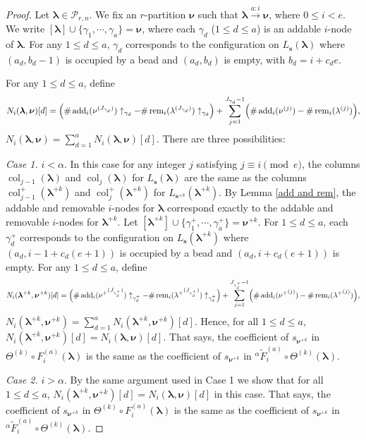 \documentclass[a4paper,10pt]{amsart}
\theoremstyle{plain}
\def\bs{{\boldsymbol{s}}}
\def\blam{{\boldsymbol \lambda}}
\def\bnu{{\boldsymbol \nu}}
\DeclareMathOperator{\col}{col}
\newcommand{\add}{\operatorname{add}}
\newcommand{\rem}{\operatorname{rem}}
\theoremstyle{plain}
\numberwithin{equation}{section}
\begin{document}
\begin{proof}
Let $\blam \in \mathscr P_{r, n}$. We fix an $r$-partition $\bnu$ such that $\blam\xrightarrow{a:i} \bnu$, where $0\le i<e$. We write $[\blam] \cup \{\gamma_1, \cdots, \gamma_a\}=\bnu$, where each $\gamma_d$ ($1\le d\le a$) is an addable $i$-node of $\blam$. For any $1\le d\le a$, $\gamma_d$ corresponds to the configuration on $L_\bs(\blam)$ where $(a_d, b_d-1)$ is occupied by a bead and $(a_d, b_d)$ is empty, with $b_d=i+c_de$.

For any $1\le d\le a$, define
$$N_i(\blam, \bnu)[d]=\Bigl(\#\add_i (\nu^{(J_{\gamma_d})} )\uparrow_{\gamma_d}-\#\rem_i (\lambda^{(J_{\gamma_d})})\uparrow_{\gamma_d}\Bigr)+ \sum^{J_{\gamma_d}-1}_{j=1}\Bigl(\#\add_i (\nu^{(j)})-\#\rem_i (\lambda^{(j)})\Bigr),$$
$N_i(\blam, \bnu)=\sum_{d=1}^a N_i(\blam, \bnu)[d].$ There are three possibilities:

{\it Case 1.} $i<\alpha$. In this case for any integer $j$ satisfying $j\equiv i\pmod e$, the columns $\col_{j-1}(\blam)$ and $\col_j(\blam)$ for $L_\bs(\blam)$ are the same as the columns $\col^+_{j-1}(\blam^{+k})$ and $\col^+_j(\blam^{+k})$ for $L_{\bs^{+k}}(\blam^{+k})$. By Lemma \ref{add and rem}, the addable and removable $i$-nodes for $\blam$ correspond exactly to the addable and removable $i$-nodes for $\blam^{+k}$.
Let $[\blam^{+k}]\cup \{\gamma^+_1, \cdots, \gamma^+_a\}=\bnu^{+k}$. For $1\le d\le a$, each $\gamma_d^+$ corresponds to the configuration on $L_\bs(\blam^{+k})$ where $(a_d, i-1+c_d(e+1))$ is occupied by a bead and $(a_d, i+c_d(e+1))$ is empty.
For any $1\le d\le a$, define
$$N_i(\blam^{+k}, \bnu^{+k})[d]=\Bigl(\#\add_i ({\nu^+}^{(J_{\gamma^+_d})} )\uparrow_{\gamma^+_d}-\#\rem_i ({\lambda^+}^{(J_{\gamma^+_d})})\uparrow_{\gamma^+_d}\Bigr)+ \sum^{J_{\gamma^+_d}-1}_{j=1}\Bigl(\#\add_i ({\nu^+}^{(j)})-\#\rem_i ({\lambda^+}^{(j)})\Bigr),$$
$N_i(\blam^{+k}, \bnu^{+k})=\sum_{d=1}^a N_i(\blam^{+k}, \bnu^{+k})[d].$
Hence, for all $1\le d\le a$, $N_i(\blam^{+k}, \bnu^{+k})[d]=N_i(\blam, \bnu)[d]$. That says, the coefficient of $s_{\bnu^{+k}}$ in $\varTheta^{(k)}\circ F_i^{(a)}(\blam)$ is the same as the coefficient of $s_{\bnu^{+k}}$ in ${^\alpha}\!\tilde{F}_i^{(a)}\circ \varTheta^{(k)}(\blam)$.
\smallskip

{\it Case 2.} $i>\alpha$. By the same argument used in Case 1 we show that  for all $1\le d\le a$, $N_i(\blam^{+k}, \bnu^{+k})[d]=N_i(\blam, \bnu)[d]$ in this case. That says, the coefficient of $s_{\bnu^{+k}}$ in $\varTheta^{(k)}\circ F_i^{(a)}(\blam)$ is the same as the coefficient of $s_{\bnu^{+k}}$ in ${^\alpha}\!\tilde{F}^{(a)}_i\circ \varTheta^{(k)}(\blam)$.



\end{proof}
\end{document}
